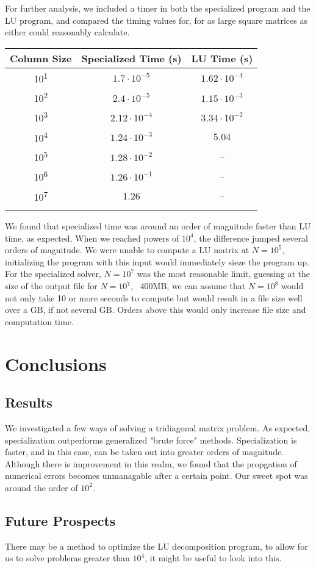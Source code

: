 \documentclass[10pt,showpacs,preprintnumbers,footinbib,amsmath,amssymb,aps,prl,twocolumn,groupedaddress,superscriptaddress,showkeys]{revtex4-1}
\begin{document}
	For further analysis, we included a timer in both the specialized program and the LU program, and compared the timing values for, for as large square matrices as either could reasonably calculate.

	\begin{center}
		\begin{tabular}{ccc}
			\hline \hline
			Column Size & Specialized Time (s) & LU Time (s)\\
			\hline		
			10\textsuperscript{1} & $1.7 \cdot 10^{-5}$      & $1.62 \cdot 10^{-4}$  \\
			10\textsuperscript{2} & $2.4 \cdot 10^{-5}$      &  $1.15 \cdot 10^{-3}$ \\
			10\textsuperscript{3} & $2.12 \cdot 10^{-4}$    &  $3.34 \cdot 10^{-2}$  \\
			10\textsuperscript{4} & $1.24 \cdot 10^{-3}$    &   5.04\\
			10\textsuperscript{5} & $1.28 \cdot 10^{-2}$    & --\\
			10\textsuperscript{6} & $1.26 \cdot 10^{-1}$    & --\\
			10\textsuperscript{7} & 1.26                               & --\\
			\hline
			\label{timingtable}
		\end{tabular}
	\end{center}
	We found that specialized time was around an order of magnitude faster than LU time, as expected, When we reached powers of $10^{4}$, the difference jumped several orders of magnitude. We were unable to compute a LU matrix at $N=10^{5}$, initializing the program with this input would immediately sieze the program up. For the specialized solver, $N=10^{7}$ was the most reasonable limit, guessing at the size of the output file for $N=10^{7}$, ~400MB, we can assume that $N=10^{8}$ would not only take 10 or more seconds to compute but would result in a file size well over a GB, if not several GB. Orders above this would only increase  file size and computation time. \\




\section{Conclusions}
	\subsection{Results}
	We investigated a few ways of solving a tridiagonal matrix problem. As expected, specialization outperforms generalized "brute force" methods. Specialization is faster, and in this case, can be taken out into greater orders of magnitude. Although there is improvement in this realm, we found that the propgation of numerical errors becomes unmanagable after a certain point. Our sweet spot was around the order of $10^{2}$.

	\subsection{Future Prospects}
	There may be a method to optimize the LU decomposition program, to allow for us to solve problems greater than $10^{4}$, it might be useful to look into this. 
\end{document}
